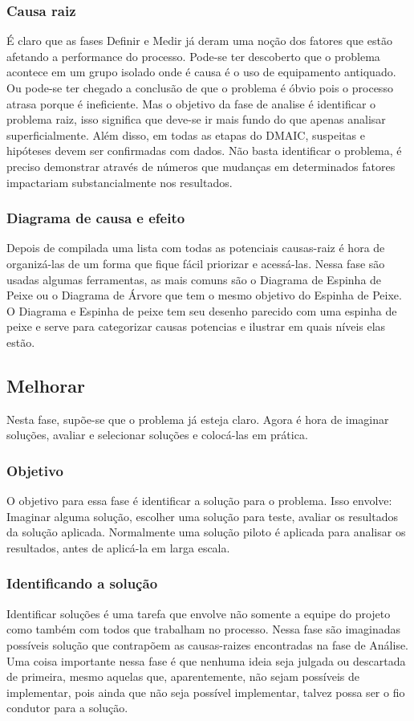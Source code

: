 \documentclass{abnt}
\begin{document}
					\subsubsection {Causa raiz}
					É claro que as fases Definir e Medir já deram uma noção dos fatores que estão afetando a performance do processo. 
					Pode-se ter descoberto que o problema acontece em um grupo isolado onde é causa é o uso de equipamento antiquado. 
					Ou pode-se ter chegado a conclusão de que o problema é óbvio pois o processo atrasa porque é ineficiente. 
					Mas o objetivo da fase de analise é identificar o problema raiz, isso significa que deve-se ir mais fundo 
					do que apenas analisar superficialmente. Além disso, em todas as etapas do DMAIC, suspeitas e 
					hipóteses devem ser confirmadas com dados. Não basta identificar o problema, é preciso demonstrar através de números 
					que mudanças em determinados fatores impactariam substancialmente nos resultados.
					\subsubsection {Diagrama de causa e efeito}
					Depois de compilada uma lista com todas as potenciais causas-raiz é hora de organizá-las de um forma que fique 
					fácil priorizar e acessá-las.
					Nessa fase são usadas algumas ferramentas, as mais comuns são o Diagrama de Espinha de Peixe ou o Diagrama de Árvore 
					que tem o mesmo objetivo do Espinha de Peixe.\\
					O Diagrama e Espinha de peixe tem seu desenho parecido com uma espinha de peixe e serve para 
					categorizar causas potencias e ilustrar em quais níveis elas estão.
				\subsection {Melhorar}
				Nesta fase, supõe-se que o problema já esteja claro. Agora é hora de imaginar soluções, avaliar e 
				selecionar soluções e colocá-las em prática.
					\subsubsection {Objetivo}
					O objetivo para essa fase é identificar a solução para o problema. Isso envolve: 
					Imaginar alguma solução, escolher uma solução para teste, avaliar os resultados da solução aplicada.
					Normalmente uma solução piloto é aplicada para analisar os resultados, antes de aplicá-la em larga escala.
					\subsubsection {Identificando a solução}
					Identificar soluções é uma tarefa que envolve não somente a equipe do projeto como também com todos que trabalham no processo. 
					Nessa fase são imaginadas possíveis solução que contrapõem as causas-raizes encontradas na fase de Análise.
					Uma coisa importante nessa fase é que nenhuma ideia seja julgada ou descartada de primeira, mesmo aquelas que, aparentemente, não sejam 
					possíveis de implementar, pois ainda que não seja possível implementar, talvez possa ser o fio condutor para a solução.
\end{document}
